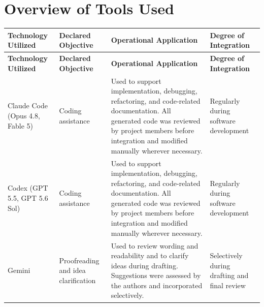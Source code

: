 \section*{Overview of Tools Used}

\begingroup
\small
\setlength{\tabcolsep}{4pt}
\renewcommand{\arraystretch}{1.3}
\begin{longtable}{|
  >{\raggedright\arraybackslash}p{}|
  >{\raggedright\arraybackslash}p{}|
  >{\raggedright\arraybackslash}p{}|
  >{\raggedright\arraybackslash}p{}|}
\hline
\rowcolor{gray!20}
\textbf{Technology Utilized} &
\textbf{Declared Objective} &
\textbf{Operational Application} &
\textbf{Degree of Integration} \\
\hline
\endfirsthead
\hline
\rowcolor{gray!20}
\textbf{Technology Utilized} &
\textbf{Declared Objective} &
\textbf{Operational Application} &
\textbf{Degree of Integration} \\
\hline
\endhead
Claude Code (Opus 4.8, Fable 5) &
Coding assistance &
Used to support implementation, debugging, refactoring, and code-related documentation. All generated code was reviewed by project members before integration and modified manually wherever necessary. &
Regularly during software development \\
\hline
Codex (GPT 5.5, GPT 5.6 Sol) &
Coding assistance &
Used to support implementation, debugging, refactoring, and code-related documentation. All generated code was reviewed by project members before integration and modified manually wherever necessary. &
Regularly during software development \\
\hline
Gemini &
Proofreading and idea clarification &
Used to review wording and readability and to clarify ideas during drafting. Suggestions were assessed by the authors and incorporated selectively. &
Selectively during drafting and final review \\
\hline
\end{longtable}
\endgroup
